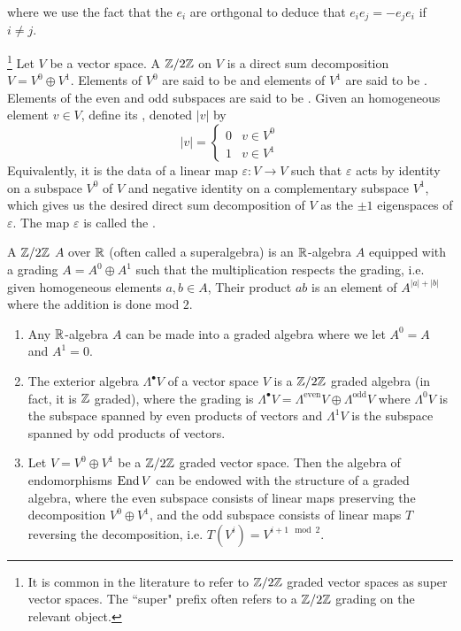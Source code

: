 where we use the fact that the $e_i$ are orthgonal to deduce that $e_ie_j = -e_je_i$
if $i \neq j$.
%
\begin{defn}\footnote{It is common in the literature to refer to $\mathbb{Z}/2\mathbb{Z}$
graded vector spaces as super vector spaces. The ``super" prefix often refers
to a $\mathbb{Z}/2\mathbb{Z}$ grading on the relevant object.}
Let $V$ be a vector space. A $\mathbb{Z} /2\mathbb{Z}$  on $V$ is a direct sum
decomposition $V = V^0 \oplus V^1$. Elements of $V^0$ are said to be 
and elements of $V^1$ are said to be . Elements of the even and odd
subspaces are said to be . Given an homogeneous element
$v \in V$, define its , denoted $|v|$ by
\[
|v| = \begin{cases}
0 & v \in V^0 \\
1 & v \in V^1
\end{cases}
\]
Equivalently, it is the data of a linear map
$\varepsilon : V \to V$ such that $\varepsilon$ acts by identity on a subspace $V^0$
of $V$ and negative identity on a complementary subspace $V^1$, which gives us the
desired direct sum decomposition of $V$ as the $\pm 1$ eigenspaces of $\varepsilon$.
The map $\varepsilon$ is called the .

\end{defn}
%
\begin{defn}
A $\mathbb{Z}/2\mathbb{Z}$  $A$ over $\mathbb{R}$ (often called a superalgebra) is
an $\mathbb{R}$-algebra $A$ equipped with a grading $A = A^0 \oplus A^1$ such that
the multiplication respects the grading, i.e. given homogeneous elements
$a,b \in A$, Their product $ab$ is an element of $A^{|a| + |b|}$ where the
addition is done mod $2$.
\end{defn}
%
\begin{exmp}\enumbreak
\begin{enumerate}
  \item Any $\mathbb{R}$-algebra $A$ can be made into a graded algebra where we let
  $A^0 = A$ and $A^1 = 0$.
  \item The exterior algebra $\Lambda^\bullet V$ of a vector space $V$ is
  a $\mathbb{Z}/2\mathbb{Z}$ graded algebra (in fact, it is $\mathbb{Z}$ graded), where the grading is
  $\Lambda^\bullet V = \Lambda^{\text{even}} V \oplus \Lambda^{\text{odd}} V$
  where $\Lambda^0 V$ is the subspace spanned by even products of vectors and
  $\Lambda^1 V$ is the subspace spanned by odd products of vectors.
  \item Let $V = V^0 \oplus V^1$ be a $\mathbb{Z}/2\mathbb{Z}$ graded vector space. Then the
  algebra of endomorphisms $\operatorname{End} V$ can be endowed with the structure of a
  graded algebra, where the even subspace consists of linear maps preserving
  the decomposition $V^0 \oplus V^1$, and the odd subspace consists of
  linear maps $T$ reversing the decomposition, i.e. $T(V^i) = V^{i + 1 \mod 2}$.
\end{enumerate}
\end{exmp}
